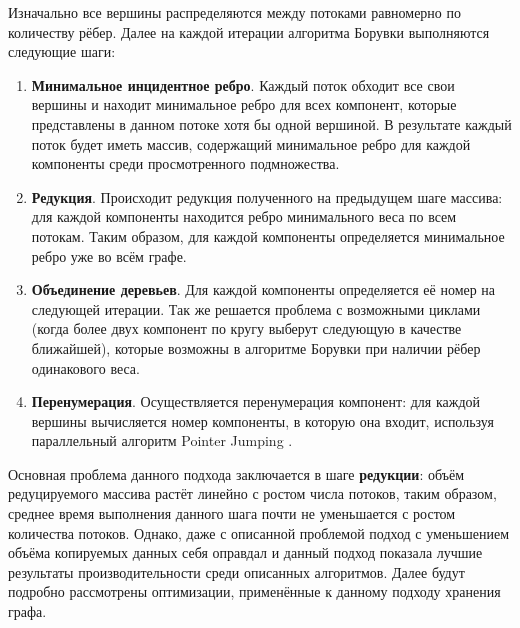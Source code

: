 \documentclass[a4paper,10pt]{extarticle}
\begin{document}
Изначально все вершины распределяются между потоками равномерно по количеству рёбер. Далее на каждой итерации алгоритма Борувки выполняются следующие шаги:

\begin{enumerate}
    \item \textbf{Минимальное инцидентное ребро}.
		Каждый поток обходит все свои вершины и находит минимальное ребро для всех компонент, которые представлены в данном потоке хотя бы одной вершиной.
        В результате каждый поток будет иметь массив, содержащий минимальное ребро для каждой компоненты среди просмотренного подмножества.
    \item \textbf{Редукция}.
          Происходит редукция полученного на предыдущем шаге массива: для каждой компоненты находится ребро минимального веса по всем потокам. 
          Таким образом, для каждой компоненты определяется минимальное ребро уже во всём графе.
    \item \textbf{Объединение деревьев}.
          Для каждой компоненты определяется её номер на следующей итерации.
          Так же решается проблема с возможными циклами (когда более двух компонент по кругу выберут следующую в качестве ближайшей), которые возможны в алгоритме Борувки при наличии рёбер одинакового веса.
    \item \textbf{Перенумерация}.
          Осуществляется перенумерация компонент: для каждой вершины вычисляется номер компоненты, в которую она входит, используя параллельный алгоритм Pointer Jumping \cite{pointer-jumping}.
\end{enumerate}

Основная проблема данного подхода заключается в шаге \textbf{редукции}: объём редуцируемого массива растёт линейно с ростом числа потоков, таким образом, среднее время выполнения данного шага почти не уменьшается с ростом количества потоков.
Однако, даже с описанной проблемой подход с уменьшением объёма копируемых данных себя оправдал и данный подход показала лучшие результаты производительности среди описанных алгоритмов.
Далее будут подробно рассмотрены оптимизации, применённые к данному подходу хранения графа.

\end{document}
